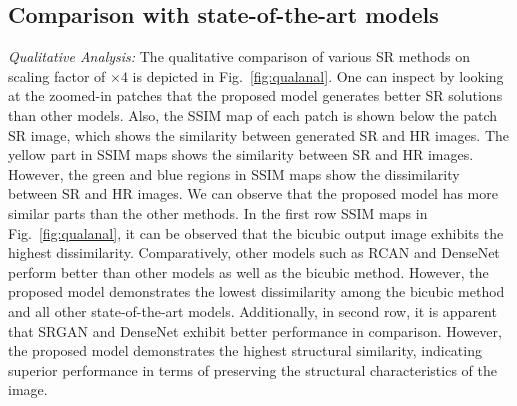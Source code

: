 \documentclass[conference]{IEEEtran}
\newcommand{\kr}[1]{\textcolor{red}{Kiran - #1}}
\begin{document}

\subsection{Comparison with state-of-the-art models}

\textit{Qualitative Analysis:}
The qualitative comparison of various SR methods on scaling factor of $\times4$ is depicted in Fig.~\ref{fig:qualanal}. One can inspect by looking at the zoomed-in patches that the proposed model generates better SR solutions than other models. %
Also, the SSIM map of each patch is shown below the patch SR image, which shows the similarity between generated SR and HR images. The yellow part in SSIM maps shows the similarity between SR and HR images. However, the green and blue regions in SSIM maps show the dissimilarity between SR and HR images. We can observe that the proposed model has more similar parts than the other methods.  In the first row SSIM maps in Fig.~\ref{fig:qualanal}, it can be observed that the bicubic output image exhibits the highest dissimilarity. Comparatively, other models such as RCAN and DenseNet perform better than other models as well as the bicubic method. However, the proposed model demonstrates the lowest dissimilarity among the bicubic method and all other state-of-the-art models. Additionally, in second row, it is apparent that SRGAN and DenseNet exhibit better performance in comparison. However, the proposed model demonstrates the highest structural similarity, indicating superior performance in terms of preserving the structural characteristics of the image. 
\end{document}
